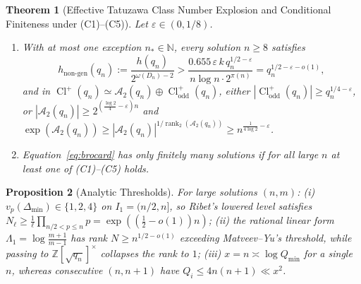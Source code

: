 \documentclass[11pt,reqno]{amsart}
\newtheorem{theorem}{Theorem}[section]
\newtheorem{proposition}[theorem]{Proposition}
\theoremstyle{remark}
\newcommand{\N}{\mathbb{N}}
\newcommand{\Z}{\mathbb{Z}}
\newcommand{\Cl}{\operatorname{Cl}}
\newcommand{\rank}{\operatorname{rank}}
\begin{document}
\begin{theorem}[Effective Tatuzawa Class Number Explosion and Conditional Finiteness under (C1)--(C5)]\label{thm:9.2}
Let $\varepsilon \in (0, 1/8)$.
\begin{enumerate}
\item[(i)] With at most one exception $n_* \in \N$, every solution $n \ge 8$ satisfies
\[
h_{\mathrm{non\text{-}gen}}(q_n) := \frac{h(q_n)}{2^{\omega(D_n)-2}} > \frac{0.655\,\varepsilon\, k\, q_n^{1/2-\varepsilon}}{n\log n \cdot 2^{\pi(n)}} = q_n^{1/2-\varepsilon-o(1)},
\]
and in $\Cl^+(q_n) \simeq \mathcal{A}_2(q_n) \oplus \Cl^+_{\mathrm{odd}}(q_n)$, either $|\Cl^+_{\mathrm{odd}}(q_n)| \ge q_n^{1/4-\varepsilon}$, or $|\mathcal{A}_2(q_n)| \ge 2^{(\frac{\log 2}{4} - \varepsilon)n}$ and $\exp(\mathcal{A}_2(q_n)) \ge |\mathcal{A}_2(q_n)|^{1/\rank_2(\mathcal{A}_2(q_n))} \ge n^{\frac{1}{4\log 2} - \varepsilon}$.
\item[(ii)] Equation~\eqref{eq:brocard} has only finitely many solutions if for all large $n$ at least one of (C1)--(C5) holds.
\end{enumerate}
\end{theorem}

\begin{proposition}[Analytic Thresholds]\label{prop:9.3}
For large solutions $(n, m)$: (i) $v_p(\Delta_{\min}) \in \{1, 2, 4\}$ on $I_1 = (n/2, n]$, so Ribet's lowered level satisfies $N_\ell \ge \frac{1}{\ell}\prod_{n/2 < p \le n} p = \exp((\frac{1}{2}-o(1))n)$; (ii) the rational linear form $\Lambda_1 = \log\frac{m+1}{m-1}$ has rank $N \ge n^{1/2-o(1)}$ exceeding Matveev--Yu's threshold, while passing to $\Z[\sqrt{q_n}]^\times$ collapses the rank to $1$; (iii) $x = n \asymp \log Q_{\min}$ for a single $n$, whereas consecutive $(n, n+1)$ have $Q_i \le 4n(n+1) \ll x^2$.
\end{proposition}
\end{document}
